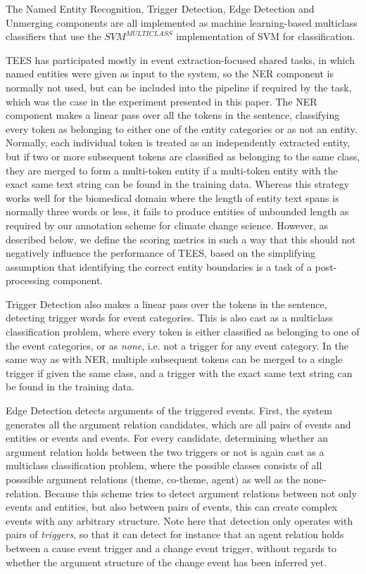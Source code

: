 The Named Entity Recognition, Trigger Detection, Edge Detection and Unmerging components are all implemented as machine learning-based multiclass classifiers that use the $SVM^{MULTICLASS}$ implementation of SVM for classification.

TEES has participated mostly in event extraction-focused shared tasks, in which named entities were given as input to the system, so the NER component is normally not used, but can be included into the pipeline if required by the task, which was the case in the experiment presented in this paper. The NER component makes a linear pass over all the tokens in the sentence, classifying every token as belonging to either one of the entity categories or as not an entity. Normally, each individual token is treated as an independently extracted entity, but if two or more subsequent tokens are classified as belonging to the same class, they are merged to form a multi-token entity if a multi-token entity with the exact same text string can be found in the training data. Whereas this strategy works well for the biomedical domain where the length of entity text spans is normally three words or less, it fails to produce entities of unbounded length as required by our annotation scheme for climate change science. However, as described below, we define the scoring metrics in such a way that this should not negatively influence the performance of TEES, based on the simplifying assumption that identifying the correct entity boundaries is a task of a post-processing component.	

Trigger Detection also makes a linear pass over the tokens in the sentence, detecting trigger words for event categories. This is also cast as a multiclass classification problem, where every token is either classified as belonging to one of the event categories, or as \emph{none}, i.e. not a trigger for any event category. In the same way as with NER, multiple subsequent tokens can be merged to a single trigger if given the same class, and a trigger with the exact same text string can be found in the training data.

Edge Detection detects arguments of the triggered events. First, the system generates all the argument relation candidates, which are all pairs of events and entities or events and events. For every candidate, determining whether an argument relation holds between the two triggers or not is again cast as a multiclass classification problem, where the possible classes consists of all posssible argument relations (theme, co-theme, agent) as well as the none-relation. Because this scheme tries to detect argument relations between not only events and entities, but also between pairs of events, this can create complex events with any arbitrary structure. Note here that detection only operates with pairs of \emph{triggers}, so that it can detect for instance that an agent relation holds between a cause event trigger and a change event trigger, without regards to whether the argument structure of the change event has been inferred yet.

